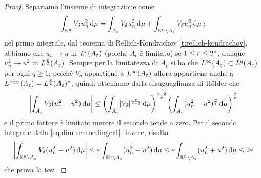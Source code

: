 \begin{proof}
    Separiamo l'insieme di integrazione come
    \begin{equation}
        \int_{\R^n}V_\delta u_n^2\,\dd\mu=
        \int_{A_\epsilon}V_\delta u_n^2\,\dd\mu+\int_{\R^n\setminus A_\epsilon}V_\delta u_n^2\,\dd\mu:
        \label{eq:dim-schroedinger1}
    \end{equation}
    nel primo integrale, dal teorema di Rellich-Kondrachov \ref{t:rellich-kondrachov}, abbiamo che $u_n\to u$ in $\leb[r]{A_\epsilon}$ (poich\'e $A_\epsilon$ è limitato) se $1\le r\le\sobc 2$, dunque $u_n^2\to u^2$ in $\leb[\frac{r}2]{A_\epsilon}$.
    Sempre per la limitatezza di $A_\epsilon$ si ha che $\leb[\infty]{A_\epsilon}\subset\leb[q]{A_\epsilon}$ per ogni $q\ge 1$; poich\'e $V_\delta$ appartiene a $\leb[\infty]{A_\epsilon}$ allora appartiene anche a $\leb[\frac{r}{r-2}]{A_\epsilon}=\dual{\leb[\frac{r}2]{A_\epsilon}}$, quindi otteniamo dalla disuguaglianza di Hölder che
    \begin{equation}
        \abs[\bigg]{\int_{A_\epsilon}V_\delta(u_n^2-u^2)\,\dd\mu}\le
        \biggl(\int_{A_\epsilon}\abs{V_\delta}^\frac{r}{r-2}\,\dd\mu\biggr)^\frac{r-2}{r}\biggl(\int_{A_\epsilon}(u_n^2-u^2)^\frac{r}2\,\dd\mu\biggr)^\frac2{r}
    \end{equation}
    e il primo fattore è limitato mentre il secondo tende a zero.
    Per il secondo integrale della \eqref{eq:dim-schroedinger1}, invece, risulta
    \begin{equation}
        \abs[\bigg]{\int_{\R^n\setminus A_\epsilon}V_\delta(u_n^2-u^2)\,\dd\mu}\le
        \epsilon\int_{\R^n\setminus A_\epsilon}(u_n^2-u^2)\,\dd\mu\le
        \epsilon\int_{\R^n\setminus A_\epsilon}(u_n^2+u^2)\,\dd\mu\le
        2\epsilon
    \end{equation}
    che prova la tesi.
\end{proof}

